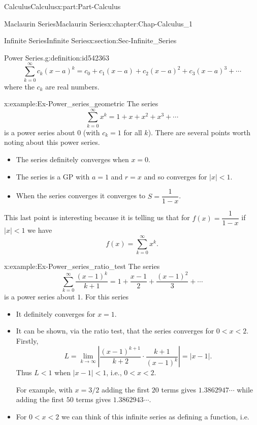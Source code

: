 \documentclass[oneside,10pt,]{book}
\numberwithin{equation}{section}
\begin{document}
\begin{partptx}{Calculus}{}{Calculus}{}{}{x:part:Part-Calculus}
\begin{chapterptx}{Maclaurin Series}{}{Maclaurin Series}{}{}{x:chapter:Chap-Calculus_1}
\begin{sectionptx}{Infinite Series}{}{Infinite Series}{}{}{x:section:Sec-Infinite_Series}
\begin{definition}{Power Series.}{g:definition:id542363}
\begin{equation*}
\sum_{k=0}^{\infty}c_k(x-a)^k = c_0 + c_1(x-a) + c_2(x-a)^2 + c_3(x-a)^3 + \cdots
\end{equation*}
where the \(c_k\) are real numbers.%
\end{definition}
\begin{example}{}{x:example:Ex-Power_series_geometric}%
The series%
\begin{equation*}
\sum_{k=0}^{\infty}x^k = 1+x+x^2+x^3+\cdots
\end{equation*}
is a power series about \(0\) (with \(c_k=1\) for all \(k\)). There are several points worth noting about this power series.%
\begin{itemize}[label=\textbullet]
\item{}The series definitely converges when \(x = 0\).%
\item{}The series is a GP with \(a=1\) and \(r=x\) and so converges for \(|x|<1\).%
\item{}When the series converges it converges to \(S=\dfrac{1}{1-x}\).%
\end{itemize}
This last point is interesting because it is telling us that for \(f(x)=\dfrac{1}{1-x}\) if \(|x|<1\) we have%
\begin{equation*}
f(x)=\sum_{k=0}^{\infty}x^k.
\end{equation*}
%
\end{example}
\begin{example}{}{x:example:Ex-Power_series_ratio_test}%
The series%
\begin{equation*}
\sum_{k=0}^{\infty}\dfrac{(x-1)^k}{k+1} = 1+\dfrac{x-1}{2}+\dfrac{(x-1)^2}{3}+\cdots
\end{equation*}
is a power series about \(1\). For this series%
\begin{itemize}[label=\textbullet]
\item{}It definitely converges for \(x = 1\).%
\item{}It can be shown, via the ratio test, that the series converges for \(0 < x <2\). Firstly,%
\begin{equation*}
L =\lim_{k\to\infty}\left|\dfrac{(x-1)^{k+1}}{k+2}\cdot\dfrac{k+1}{(x-1)^k}\right| = |x-1|.
\end{equation*}
Thus \(L<1\) when \(|x-1|<1\), i.e., \(0 < x <2\).%
\par
For example, with \(x=3/2\) adding the first \(20\) terms gives \(1.3862947\cdots\) while adding the first \(50\) terms gives \(1.3862943\cdots\).%
\item{}For \(0 < x <2\) we can think of this infinite series as defining a function, i.e.%

\end{itemize}
\end{example}
\end{sectionptx}
\end{chapterptx}
\end{partptx}
\end{document}
